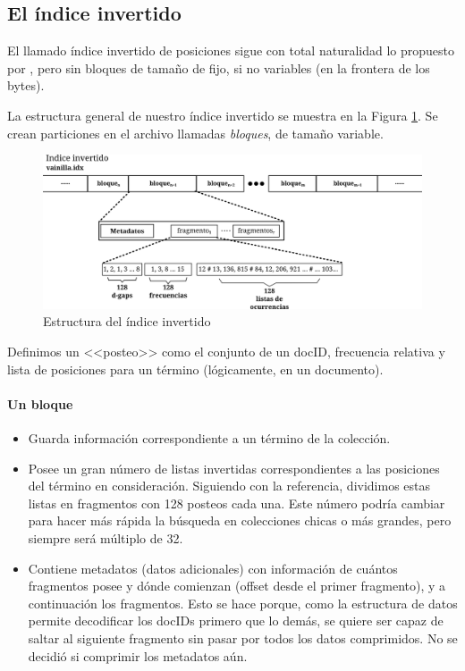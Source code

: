 \subsection{El índice invertido}

El llamado índice invertido de posiciones sigue con total naturalidad lo propuesto por \cite{Zhang:2008}, pero sin bloques de tamaño de fijo, si no variables (en la frontera de los bytes).

La estructura general de nuestro índice invertido se muestra en la Figura \ref{fig:indice}. Se crean particiones en el archivo llamadas \textit{bloques}, de tamaño variable. 

\begin{figure}[h]
\centering
    \includegraphics[scale=0.9]{./Images/estructura_1.png}
\caption{Estructura del índice invertido}
\label{fig:indice}
\end{figure}


Definimos un <<posteo>> como el conjunto de un docID, frecuencia relativa y lista de posiciones para un término (lógicamente, en un documento).

\paragraph{Un bloque}

\begin{itemize}

\item Guarda información correspondiente a un término de la colección.

\item Posee un gran número de listas invertidas correspondientes a las posiciones del término en consideración. Siguiendo con la referencia, dividimos estas listas en fragmentos con 128 posteos cada una. Este número podría cambiar para hacer más rápida la búsqueda en colecciones chicas o más grandes, pero siempre será múltiplo de 32.

\item Contiene metadatos (datos adicionales) con información de cuántos fragmentos posee y dónde comienzan (offset desde el primer fragmento), y a continuación los fragmentos. Esto se hace porque, como la estructura de datos permite decodificar los docIDs primero que lo demás, se quiere ser capaz de saltar al siguiente fragmento sin pasar por todos los datos comprimidos. No se decidió si comprimir los metadatos aún.

\end{itemize}

